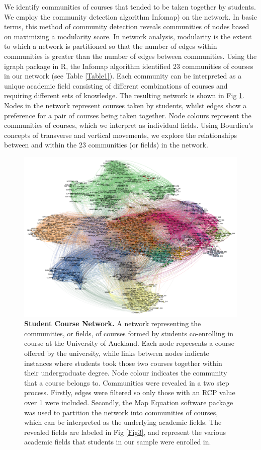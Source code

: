 We identify communities of courses that tended to be taken together by students. We employ the community detection algorithm Infomap\cite{Edler_2017}) on the network. In basic terms, this method of community detection reveals communities of nodes based on maximizing a modularity score. In network analysis, modularity is the extent to which a network is partitioned so that the number of edges within communities is greater than the number of edges between communities. Using the igraph package in R\cite{csardi2006igraph}, the Infomap algorithm identified 23 communities of courses in our network (see Table \ref{Table1}). Each community can be interpreted as a unique academic field consisting of different combinations of courses and requiring different sets of knowledge. The resulting network is shown in Fig \ref{Fig2}. Nodes in the network represent courses taken by students, whilst edges show a preference for a pair of courses being taken together. Node colours represent the communities of courses, which we interpret as individual fields. Using Bourdieu's concepts of transverse and vertical movements, we explore the relationships between and within the 23 communities (or fields) in the network.

\begin{figure}[!ht]
\centering
 \includegraphics[width = \linewidth]{C3 - Bourdieu Networks/C3 - Fig2.pdf}\caption{\textbf{Student Course Network.\newline} 
A network representing the communities, or fields, of courses formed by students co-enrolling in course at the University of Auckland. Each node represents a course offered by the university, while links between nodes indicate instances where students took those two courses together within their undergraduate degree. Node colour indicates the community that a course belongs to. Communities were revealed in a two step process. Firstly, edges were filtered so only those with an RCP value over 1 were included. Secondly, the Map Equation software package\cite{Edler_2017} was used to partition the network into communities of courses, which can be interpreted as the underlying academic fields. The revealed fields are labeled in Fig \ref{Fig3}, and represent the various academic fields that students in our sample were enrolled in.}
\label{Fig2}
\end{figure}


